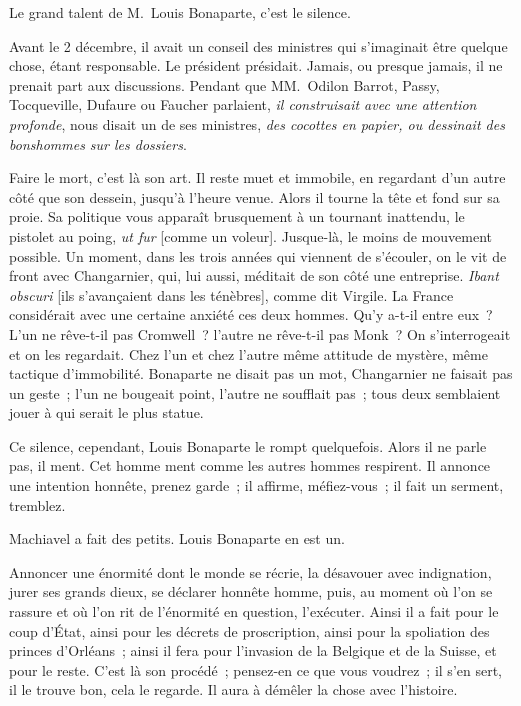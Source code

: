 \documentclass[french,twoside]{book} %
\begin{document}
Le grand talent de M. Louis Bonaparte, c’est le silence.\par
Avant le 2 décembre, il avait un conseil des ministres qui s’imaginait être quelque chose, étant responsable. Le président présidait. Jamais, ou presque jamais, il ne prenait part aux discussions. Pendant que MM. Odilon Barrot, Passy, Tocqueville, Dufaure ou Faucher parlaient, \emph{il construisait avec une attention profonde}, nous disait un de ses ministres, \emph{des cocottes en papier, ou dessinait des bonshommes sur les dossiers}.\par
Faire le mort, c’est là son art. Il reste muet et immobile, en regardant d’un autre côté que son dessein, jusqu’à l’heure venue. Alors il tourne la tête et fond sur sa proie. Sa politique vous apparaît brusquement à un tournant inattendu, le pistolet au poing, \emph{ut fur} [comme un voleur]. Jusque-là, le moins de mouvement possible. Un moment, dans les trois années qui viennent de s’écouler, on le vit de front avec Changarnier, qui, lui aussi, méditait de son côté une entreprise. \emph{Ibant obscuri} [ils s’avançaient dans les ténèbres], comme dit Virgile. La France considérait avec une certaine anxiété ces deux hommes. Qu’y a-t-il entre eux ? L’un ne rêve-t-il pas Cromwell ? l’autre ne rêve-t-il pas Monk ? On s’interrogeait et on les regardait. Chez l’un et chez l’autre même attitude de mystère, même tactique d’immobilité. Bonaparte ne disait pas un mot, Changarnier ne faisait pas un geste ; l’un ne bougeait point, l’autre ne soufflait pas ; tous deux semblaient jouer à qui serait le plus statue.\par
Ce silence, cependant, Louis Bonaparte le rompt quelquefois. Alors il ne parle pas, il ment. Cet homme ment comme les autres hommes respirent. Il annonce une intention honnête, prenez garde ; il affirme, méfiez-vous ; il fait un serment, tremblez.\par
Machiavel a fait des petits. Louis Bonaparte en est un.\par
Annoncer une énormité dont le monde se récrie, la désavouer avec indignation, jurer ses grands dieux, se déclarer honnête homme, puis, au moment où l’on se rassure et où l’on rit de l’énormité en question, l’exécuter. Ainsi il a fait pour le coup d’État, ainsi pour les décrets de proscription, ainsi pour la spoliation des princes d’Orléans ; ainsi il fera pour l’invasion de la Belgique et de la Suisse, et pour le reste. C’est là son procédé ; pensez-en ce que vous voudrez ; il s’en sert, il le trouve bon, cela le regarde. Il aura à démêler la chose avec l’histoire.\par
\end{document}

